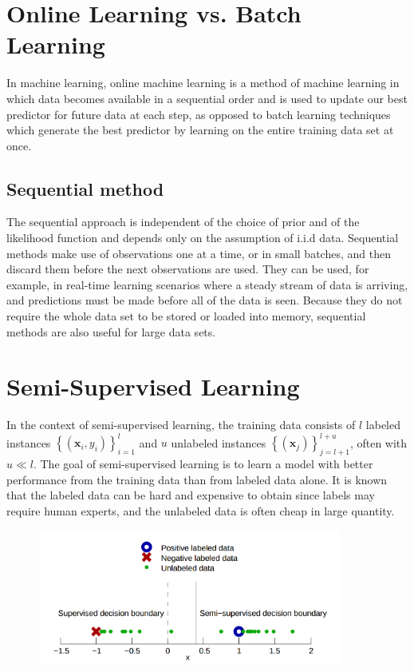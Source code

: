 \documentclass{article}
\begin{document}
\section{Online Learning vs. Batch Learning}
In machine learning, online machine learning is a method of machine
learning in which data becomes available in a sequential order and is
used to update our best predictor for future data at each step, as
opposed to batch learning techniques which generate the best predictor
by learning on the entire training data set at once.

\subsection{Sequential method}
The sequential approach is independent of the choice of prior and of
the likelihood function and depends only on the assumption of i.i.d
data. Sequential methods make use of observations one at a time, or in
small batches, and then discard them before the next observations are
used. They can be used, for example, in real-time learning scenarios
where a steady stream of data is arriving, and predictions must be
made before all of the data is seen. Because they do not require the
whole data set to be stored or loaded into memory, sequential methods
are also useful for large data sets.

\section{Semi-Supervised Learning}
In the context of semi-supervised learning, the training data consists
of $l$ labeled instances $\left \{ (\mathbf{x}_i, y_i)
\right \}_{i=1}^{l}$ and $u$ unlabeled instances $\left \{ (\mathbf{x}_j)
\right \}_{j=l+1}^{l+u}$, often with $u \ll l$. The goal of
semi-supervised learning is to learn a model with better performance
from the training data than from labeled data alone. It is known that
the labeled data can be hard and expensive to obtain since labels may
require human experts, and the unlabeled data is often cheap in large
quantity.

\begin{figure}[h] \label{fg:ssl_model}
  \centering
\includegraphics[width=10cm]{ssl.png}
\end{figure}
\end{document}
